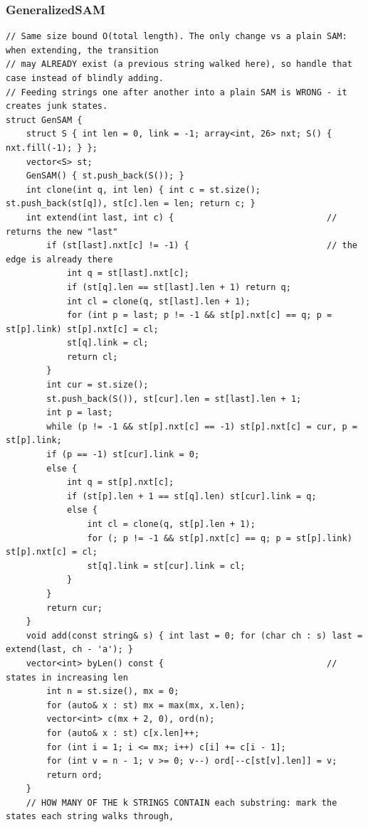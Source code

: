 \documentclass[9pt,a4paper,twocolumn]{extarticle}
\begin{document}
\subsubsection{GeneralizedSAM}
\nopagebreak
\begin{lstlisting}
// Same size bound O(total length). The only change vs a plain SAM: when extending, the transition
// may ALREADY exist (a previous string walked here), so handle that case instead of blindly adding.
// Feeding strings one after another into a plain SAM is WRONG - it creates junk states.
struct GenSAM {
    struct S { int len = 0, link = -1; array<int, 26> nxt; S() { nxt.fill(-1); } };
    vector<S> st;
    GenSAM() { st.push_back(S()); }
    int clone(int q, int len) { int c = st.size(); st.push_back(st[q]), st[c].len = len; return c; }
    int extend(int last, int c) {                              // returns the new "last"
        if (st[last].nxt[c] != -1) {                           // the edge is already there
            int q = st[last].nxt[c];
            if (st[q].len == st[last].len + 1) return q;
            int cl = clone(q, st[last].len + 1);
            for (int p = last; p != -1 && st[p].nxt[c] == q; p = st[p].link) st[p].nxt[c] = cl;
            st[q].link = cl;
            return cl;
        }
        int cur = st.size();
        st.push_back(S()), st[cur].len = st[last].len + 1;
        int p = last;
        while (p != -1 && st[p].nxt[c] == -1) st[p].nxt[c] = cur, p = st[p].link;
        if (p == -1) st[cur].link = 0;
        else {
            int q = st[p].nxt[c];
            if (st[p].len + 1 == st[q].len) st[cur].link = q;
            else {
                int cl = clone(q, st[p].len + 1);
                for (; p != -1 && st[p].nxt[c] == q; p = st[p].link) st[p].nxt[c] = cl;
                st[q].link = st[cur].link = cl;
            }
        }
        return cur;
    }
    void add(const string& s) { int last = 0; for (char ch : s) last = extend(last, ch - 'a'); }
    vector<int> byLen() const {                                // states in increasing len
        int n = st.size(), mx = 0;
        for (auto& x : st) mx = max(mx, x.len);
        vector<int> c(mx + 2, 0), ord(n);
        for (auto& x : st) c[x.len]++;
        for (int i = 1; i <= mx; i++) c[i] += c[i - 1];
        for (int v = n - 1; v >= 0; v--) ord[--c[st[v].len]] = v;
        return ord;
    }
    // HOW MANY OF THE k STRINGS CONTAIN each substring: mark the states each string walks through,

\end{lstlisting}
\end{document}
